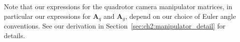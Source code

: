 Note that our expressions for the quadrotor camera manipulator matrices, in particular our expressions for $\mathbf{A}_q$ and $\mathbf{A}_g$, depend on our choice of Euler angle conventions.
See our derivation in Section~\ref{sec:ch2:manipulator_detail} for details.

